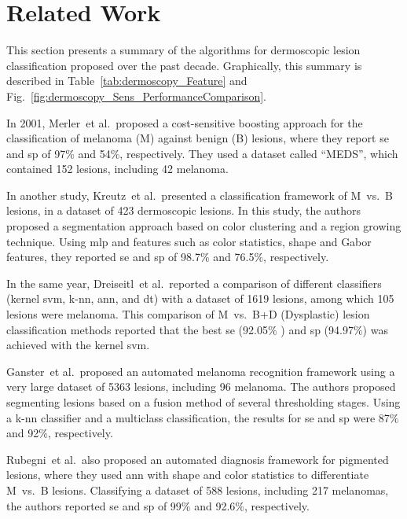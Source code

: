 \section{Related Work}
\label{sec:chp3-sec2}
This section presents a summary of the algorithms for dermoscopic lesion classification proposed over the past decade.
Graphically, this summary is described in Table~\ref{tab:dermoscopy_Feature} and Fig.~\ref{fig:dermoscopy_Sens_PerformanceComparison}.

In 2001, Merler~et al.\,\cite{merler2001tuning} proposed a cost-sensitive boosting approach for the classification of melanoma (M) against benign (B) lesions, where they report \ac{se} and \ac{sp} of 97\% and 54\%, respectively.
They used a dataset called ``MEDS'', which contained 152 lesions, including 42 melanoma.

In another study, Kreutz~et al.\,\cite{kreutz2001automated} presented a classification framework of M~vs.~B lesions, in a dataset of 423 dermoscopic lesions.
In this study, the authors proposed a segmentation approach based on color clustering and a region growing technique. 
Using \acf{mlp} and features such as color statistics, shape and Gabor features, they reported \ac{se} and \ac{sp} of 98.7$\%$ and 76.5$\%$, respectively.

In the same year, Dreiseitl~et al.\,\cite{dreiseitl2001comparison} reported a comparison of different classifiers (kernel \ac{svm}, k-\ac{nn}, \ac{ann}, and \acf{dt}) with a dataset of 1619 lesions, among which 105 lesions were melanoma.
This comparison of M~vs.~B+D (Dysplastic) lesion classification methods reported that the best \ac{se} (92.05$\%$ ) and \ac{sp} (94.97$\%$) was achieved with the kernel \ac{svm}.

Ganster~et al.\,\cite{ganster2001automated} proposed an automated melanoma recognition framework using a very large dataset of 5363 lesions, including 96 melanoma.
The authors proposed segmenting lesions based on a fusion method of several thresholding stages.
Using a k-\ac{nn} classifier and a multiclass classification, the results for \ac{se} and \ac{sp} were 87$\%$ and 92$\%$, respectively.

Rubegni~et al.\,\cite{rubegni2002automated} also proposed an automated diagnosis framework for pigmented lesions, where they used \ac{ann} with shape and color statistics to differentiate M~vs.~B lesions.
Classifying a dataset of 588 lesions, including 217 melanomas, the authors reported \ac{se} and \ac{sp} of 99$\%$ and 92.6$\%$, respectively.

